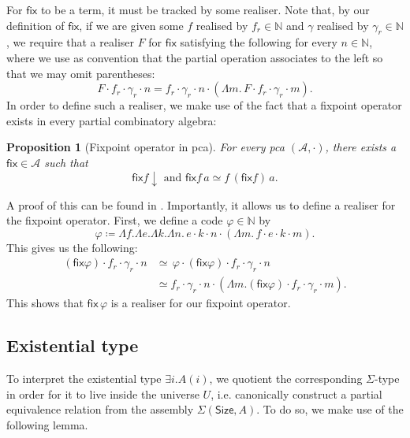 \documentclass[10pt,a4paper]{article}
\newtheorem{proposition}[theorem]{Proposition}
\theoremstyle{definition}
\theoremstyle{remark}
\renewcommand{\.}{.\,} %
\renewcommand{\:}{:} %
\newcommand{\bN}{\mathbb{N}}
\newcommand{\Size}{\mathsf{Size}}
\newcommand{\fix}{\mathsf{fix}}
\newcommand{\0}{\mathbf{0}}
\newcommand{\1}{\mathbf{1}}
\newcommand\<\langle
\renewcommand\>\rangle
\newcommand{\cA}{\mathcal{A}}
\newcommand{\U}{U}
\theoremstyle{remark}
\begin{document}
For $\fix$ to be a term, it must be tracked by some realiser. Note that, by our definition of $\fix$, if we are given some $f$ realised by $f_r \in \bN$ and $\gamma$ realised by $\gamma_r \in \bN$, we require that a realiser $F$ for $\fix$ satisfying the following for every $n \in \bN$, where we use as convention that the partial operation associates to the left so that we may omit parentheses:
\[
F \cdot f_r \cdot \gamma_r \cdot n = f_r \cdot \gamma_r \cdot n \cdot (\Lambda m \. F \cdot f_r \cdot \gamma_r \cdot m).
\]
In order to define such a realiser, we make use of the fact that a fixpoint operator exists in every partial combinatory algebra:
\begin{proposition}[Fixpoint operator in pca]
    For every pca $(\cA, \cdot)$, there exists a $\fix\! \in \cA$ such that 
    \[
    \fix f \downarrow \text{ and } 
    \fix f \, a \simeq f \, (\fix f) \, a.
    \]
\end{proposition}
A proof of this can be found in \cite{oosten}.
Importantly, it allows us to define a realiser for the fixpoint operator. First, we define a code $\varphi \in \bN$ by
\[
\varphi \coloneq  \Lambda f. \Lambda e . \Lambda k . \Lambda n \. e \cdot k \cdot n \cdot (\Lambda m \. f \cdot e \cdot k \cdot m).
\]
This gives us the following:
\begin{align*}
(\fix \varphi) \cdot f_r \cdot \gamma_r \cdot n &\simeq \, \varphi \cdot (\fix \varphi) \cdot f_r \cdot \gamma_r \cdot n \\
&\simeq f_r \cdot \gamma_r \cdot n \cdot (\Lambda m . (\fix \varphi) \cdot f_r \cdot \gamma_r \cdot m).
\end{align*}
This shows that $\fix \, \varphi$ is a realiser for our fixpoint operator.



\subsection{Existential type}
To interpret the existential type $\exists i . A(i)$, we quotient the corresponding $\Sigma$-type in order for it to live inside the universe $\U$, i.e. canonically construct a partial equivalence relation from the assembly $\Sigma(\Size, A)$. To do so, we make use of the following lemma.
\end{document}
